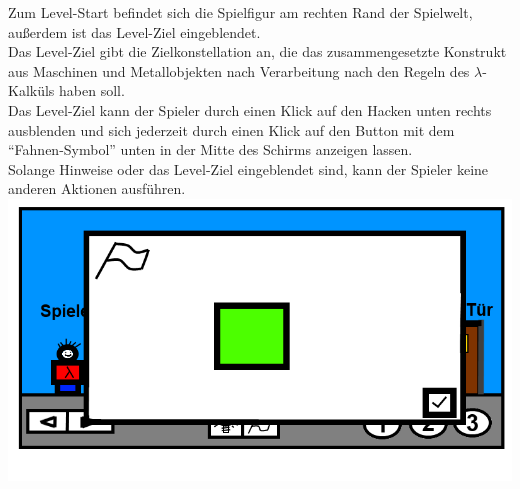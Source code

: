 \documentclass{scrartcl}
\begin{document}
\begin{description}
	\begin{enumerate}
		\begin{minipage}{1\textwidth}
			\item \label{Levelaufbau:Levelstart	} Zum Level-Start befindet sich die Spielfigur am rechten Rand der Spielwelt,\\
			außerdem ist das Level-Ziel eingeblendet.\\
			Das Level-Ziel gibt die Zielkonstellation an, die das zusammengesetzte Konstrukt aus Maschinen und Metallobjekten nach Verarbeitung nach den Regeln des $\lambda$-Kalküls haben soll.\\
			Das Level-Ziel kann der Spieler durch einen Klick auf den Hacken unten rechts ausblenden und sich jederzeit durch einen Klick auf den Button mit dem ``Fahnen-Symbol'' unten in der Mitte des Schirms anzeigen lassen.\\ Solange Hinweise oder das Level-Ziel eingeblendet sind, kann der Spieler keine anderen Aktionen ausführen.\\
			\includegraphics[scale=0.5]{assets/Levelziel}
		\end{minipage}
		

\end{enumerate}
\end{description}
\end{document}
